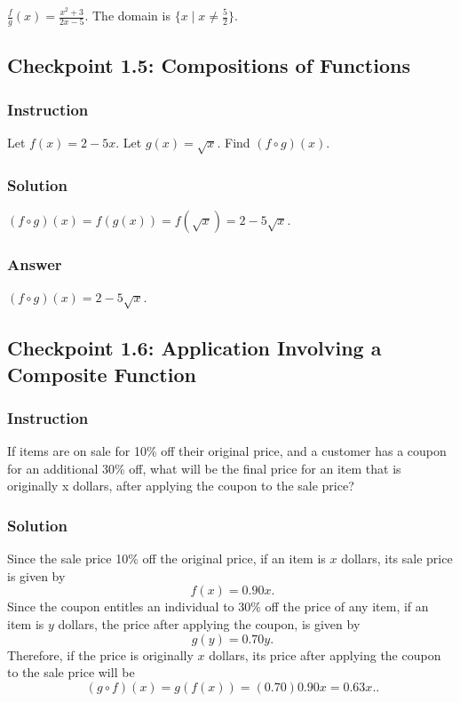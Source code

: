 \documentclass[11pt, letterpaper, oneside]{memoir}
\begin{document}
$ \frac{f}{g}(x) = \frac{x^2 + 3}{2x - 5} $. The domain is $ \{ x \mid x \ne \frac{5}{2} \} $.

\subsection*{Checkpoint 1.5: Compositions of Functions}

\subsubsection{Instruction}

Let $ f(x) = 2 - 5x $. Let $ g(x) = \sqrt{x} $. Find $ (f \circ g)(x) $.

\subsubsection{Solution}

$ (f \circ g)(x) = f(g(x)) = f(\sqrt{x}) = 2 - 5\sqrt{x} $.

\subsubsection{Answer}

$ (f \circ g)(x) = 2 - 5\sqrt{x} $.

\subsection*{Checkpoint 1.6: Application Involving a Composite Function}

\subsubsection{Instruction}

If items are on sale for 10\% off their original price, and a customer has a coupon for an additional 30\% off, what will be the final price for an item that is originally x dollars, after applying the coupon to the sale price?

\subsubsection{Solution}

Since the sale price 10\% off the original price, if an item is $ x $ dollars, its sale price is given by
$$ \phantom{.}
f(x) = 0.90x
.$$
Since the coupon entitles an individual to 30\% off the price of any item, if an item is $ y $ dollars, the price after applying the coupon, is given by
$$ \phantom{.}
g(y) = 0.70y
.$$
Therefore, if the price is originally $ x $ dollars, its price after applying the coupon to the sale price will be
$$ \phantom{.}
(g \circ f)(x) = g(f(x)) = (0.70)0.90x = 0.63x.
.$$
\end{document}

